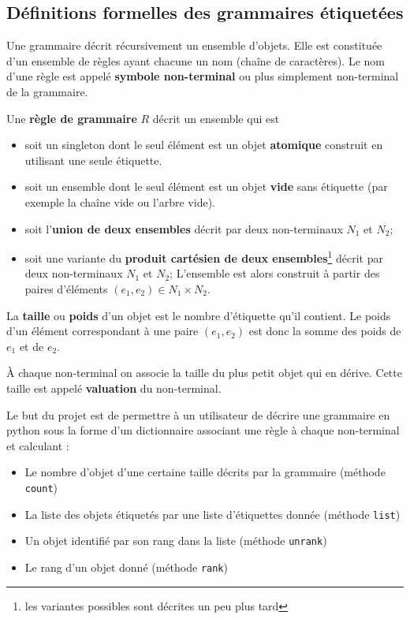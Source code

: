 \documentclass[11pt]{article}
\renewcommand{\emph}[1]{\textbf{#1}}
\begin{document}
\subsection{Définitions formelles des grammaires étiquetées}

Une grammaire décrit récursivement un ensemble d'objets. Elle est constituée
d'un ensemble de règles ayant chacune un nom (chaîne de caractères). Le nom
d'une règle est appelé \emph{symbole non-terminal} ou plus simplement
non-terminal de la grammaire.  \medskip

Une \emph{règle de grammaire} $R$ décrit un ensemble qui est
\begin{itemize}
\item soit un singleton dont le seul élément est un objet
  \emph{atomique} construit en utilisant une seule étiquette.
\item soit un ensemble dont le seul élément est un objet
  \emph{vide} sans étiquette (par exemple la chaîne vide ou l'arbre vide).
\item soit l'\emph{union de deux ensembles} décrit par deux
  non-terminaux $N_1$ et $N_2$;
\item soit une variante du \emph{produit
    cartésien de deux ensembles}\footnote{les variantes possibles sont décrites un peu plus tard} 
    décrit par deux non-terminaux $N_1$ et $N_2$;
  L'ensemble est alors construit à partir des paires d'éléments $(e_1, e_2)
  \in N_1 \times N_2$.
\end{itemize}
\medskip

La \emph{taille} ou \emph{poids} d'un objet est le nombre d'étiquette qu'il
contient. Le poids d'un élément correspondant à une paire $(e_1, e_2)$ est
donc la somme des poids de $e_1$ et de $e_2$.

À chaque non-terminal on associe la taille du plus petit objet qui en dérive.
Cette taille est appelé \emph{valuation} du non-terminal.

Le but du projet est de permettre à un utilisateur de décrire une grammaire
en python sous la forme d'un dictionnaire associant une règle à chaque 
non-terminal et calculant : 
\begin{itemize}
\item Le nombre d'objet d'une certaine taille décrits par la grammaire (méthode {\tt count})
\item La liste des objets étiquetés par une liste d'étiquettes donnée (méthode {\tt list})
\item Un objet identifié par son rang dans la liste (méthode {\tt unrank})
\item Le rang d'un objet donné (méthode {\tt rank})
\end{itemize}
\end{document}

